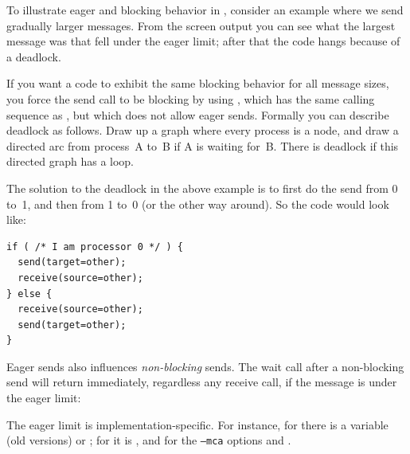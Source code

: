 To illustrate eager and blocking behavior in ,
consider an example where we send
gradually larger messages. From the screen output you can see what
the largest message was that fell under the eager limit; after that the code
hangs because of a deadlock.
%
%
%

If you want a code to exhibit the same blocking behavior for  all message sizes,
you force the send call to be blocking by using
, which has the same calling sequence as ,
but which does not allow eager sends.
%
%
Formally you can describe deadlock as follows. Draw up a graph where
every process is a node, and draw a directed arc from process~A to~B if
A is waiting for~B. There is deadlock if this directed graph has a
loop.

The solution to the deadlock in the above example is to first do the
send from 0 to~1, and then from 1 to~0 (or the other way around). So
the code would look like:
\begin{lstlisting}
if ( /* I am processor 0 */ ) {
  send(target=other);
  receive(source=other);
} else {
  receive(source=other);
  send(target=other);
}
\end{lstlisting}

Eager sends also influences
\emph{non-blocking} sends.
The wait call after a non-blocking send
will return immediately, regardless any receive call,
if the message is under the eager limit:
%
%

The eager limit is implementation-specific.
For instance,
for  there is a variable
 (old versions) or ;
for  it is ,
and for  the
\texttt{--mca} options  and
.

